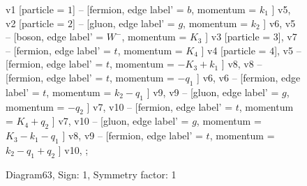 \documentclass{revtex4}
\begin{document}
\begin{figure}[!htb]
\begin{center}
{    %
v1 [particle = \(1\)] -- [fermion, edge label' = \(b\), momentum = \(k_{1}\) ] v5, 
v2 [particle = \(2\)] -- [gluon, edge label' = \(g\), momentum = \(k_{2}\) ] v6, 
v5 -- [boson, edge label' = \(W^{-}\), momentum = \(K_{3}\) ] v3 [particle = \(3\)], 
v7 -- [fermion, edge label' = \(t\), momentum = \(K_{4}\) ] v4 [particle = \(4\)], 
v5 -- [fermion, edge label' = \(t\), momentum = \(-K_{3} + k_{1}\) ] v8, 
v8 -- [fermion, edge label' = \(t\), momentum = \(-q_{1}\) ] v6, 
v6 -- [fermion, edge label' = \(t\), momentum = \(k_{2} - q_{1}\) ] v9, 
v9 -- [gluon, edge label' = \(g\), momentum = \(-q_{2}\) ] v7, 
v10 -- [fermion, edge label' = \(t\), momentum = \(K_{4} + q_{2}\) ] v7, 
v10 -- [gluon, edge label' = \(g\), momentum = \(K_{3} - k_{1} - q_{1}\) ] v8, 
v9 -- [fermion, edge label' = \(t\), momentum = \(k_{2} - q_{1} + q_{2}\) ] v10, 
};
\end{center}
\caption{Diagram63, Sign: 1, Symmetry factor: 1}
\end{figure}
\newpage
\end{document}
